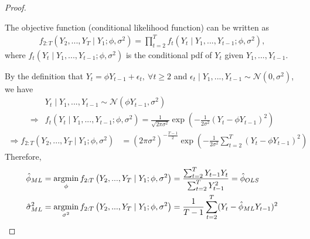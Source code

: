 \documentclass[11pt]{elegantbook}
\newcommand{\argmin}{\operatornamewithlimits{argmin}}
\begin{document}
\begin{proof}
    
    \begin{definition}
        The objective function (conditional likelihood function) can be written as
        \begin{equation}
            \begin{aligned}
                f_{2:T}\left(Y_2,...,Y_T\mid Y_1;\phi,\sigma^2\right)=\prod_{t=2}^Tf_t\left(Y_t\mid Y_1,...,Y_{t-1};\phi,\sigma^2\right),
            \end{aligned}
            \nonumber
        \end{equation}
        where $f_t\left(Y_t\mid Y_1,...,Y_{t-1};\phi,\sigma^2\right)$ is the conditional pdf of $Y_t$ given $Y_1,...,Y_{t-1}$.
    \end{definition}
    By the definition that $Y_t=\phi Y_{t-1}+\epsilon_t,\ \forall t\geq 2$ and $\epsilon_t\mid Y_{1},...,Y_{t-1}\sim \mathcal{N}(0,\sigma^2)$, we have
    \begin{equation}
        \begin{aligned}
            &Y_t\mid Y_1,...,Y_{t-1}\sim \mathcal{N}(\phi Y_{t-1},\sigma^2)\\
            \Rightarrow& f_t\left(Y_t\mid Y_1,...,Y_{t-1};\phi,\sigma^2\right)=\frac{1}{\sqrt{2\pi\sigma^2}}\exp\left(-\frac{1}{2\sigma^2}\left(Y_t-\phi Y_{t-1}\right)^2\right)
        \end{aligned}
        \nonumber
    \end{equation}
    \begin{equation}
        \begin{aligned}
            \Rightarrow f_{2:T}\left(Y_2,...,Y_T\mid Y_1;\phi,\sigma^2\right)%
            &=\left(2\pi\sigma^2\right)^{-\frac{T-1}{2}}\exp\left(-\frac{1}{2\sigma^2}\sum_{t=2}^T\left(Y_t-\phi Y_{t-1}\right)^2\right)
        \end{aligned}
        \nonumber
    \end{equation}
    Therefore,
    \begin{equation}
        \begin{aligned}
            \hat{\phi}_{ML}&=\argmin_{\phi} f_{2:T}\left(Y_2,...,Y_T\mid Y_1;\phi,\sigma^2\right)=\frac{\sum_{t=2}^TY_{t-1}Y_t}{\sum_{t=2}^T Y_{t-1}^2}=\hat{\phi}_{OLS}\\
            \hat{\sigma}^2_{ML}&=\argmin_{\sigma^2} f_{2:T}\left(Y_2,...,Y_T\mid Y_1;\phi,\sigma^2\right)=\frac{1}{T-1}\sum_{t=2}^T (Y_t-\hat{\phi}_{ML}Y_{t-1})^2
        \end{aligned}
        \nonumber
    \end{equation}
\end{proof}
\end{document}
